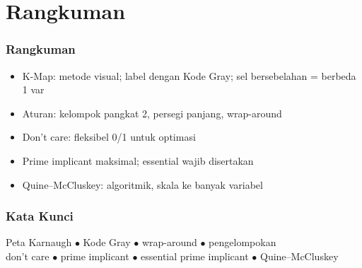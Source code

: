 \documentclass[handout]{beamer}
\theoremstyle{definition}
\theoremstyle{example}
\begin{document}
\section{Rangkuman}

\begin{frame}
\frametitle{Rangkuman}
\begin{itemize}
  \item K-Map: metode visual; label dengan Kode Gray; sel bersebelahan = berbeda 1 var
  \item Aturan: kelompok pangkat 2, persegi panjang, wrap-around
  \item Don't care: fleksibel 0/1 untuk optimasi
  \item Prime implicant maksimal; essential wajib disertakan
  \item Quine--McCluskey: algoritmik, skala ke banyak variabel
\end{itemize}
\end{frame}

\begin{frame}
\frametitle{Kata Kunci}
\begin{center}
\small
Peta Karnaugh $\bullet$ Kode Gray $\bullet$ wrap-around $\bullet$ pengelompokan\\
don't care $\bullet$ prime implicant $\bullet$ essential prime implicant $\bullet$ Quine--McCluskey
\end{center}
\end{frame}
\end{document}
